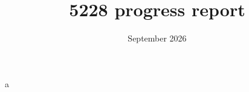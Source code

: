 \documentclass[10pt]{article}
\title{5228 progress report}
\date{September 2026}
\begin{document}
a
\section{}
\end{document}
